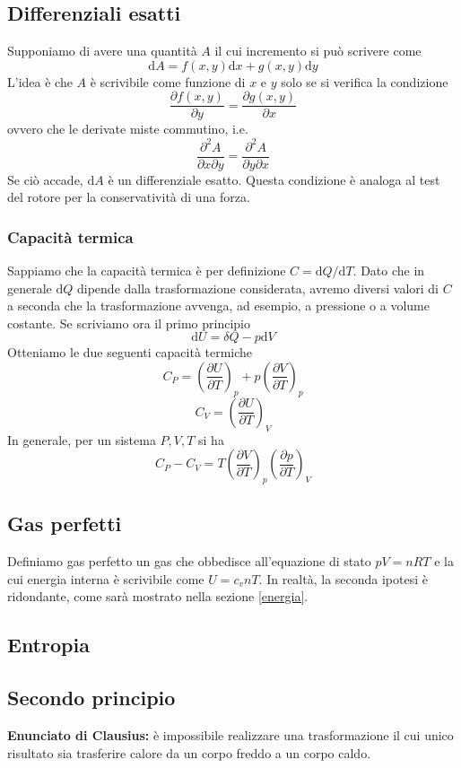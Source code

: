 \documentclass[a4paper,11pt]{article}
\begin{document}
\subsection{Differenziali esatti}
Supponiamo di avere una quantità $A$ il cui incremento si può scrivere come
\[\mathrm{d}A=f(x,y)\mathrm{d}x+g(x,y)\mathrm{d}y\]
L'idea è che $A$ è scrivibile come funzione di $x$ e $y$ solo se si verifica la condizione
\[\frac{\partial f(x,y)}{\partial y}=\frac{\partial g(x,y)}{\partial x}\]
ovvero che le derivate miste commutino, i.e.
\[\frac{\partial^2A}{\partial x\partial y}=\frac{\partial^2A}{\partial y\partial x}\]
Se ciò accade, $\mathrm{d}A$ è un differenziale esatto. Questa condizione è analoga al test del rotore per la conservatività di una forza.

\subsubsection{Capacità termica}
Sappiamo che la capacità termica è per definizione $C=\mathrm{d}Q/\mathrm{d}T$. Dato che in generale $\mathrm{d}Q$ dipende dalla trasformazione considerata, avremo diversi valori di $C$ a seconda che la trasformazione avvenga, ad esempio, a pressione o a volume costante. Se scriviamo ora il primo principio
\[\mathrm{d}U=\delta Q-p\mathrm{d}V\]
Otteniamo le due seguenti capacità termiche
\[C_P=\left(\frac{\partial U}{\partial T}\right)_p+p\left(\frac{\partial V}{\partial T}\right)_p\]
\[C_V=\left(\frac{\partial U}{\partial T}\right)_V\]
In generale, per un sistema $P,V,T$ si ha
\[C_P-C_V=T\left(\frac{\partial V}{\partial T}\right)_{p}\left(\frac{\partial p}{\partial T}\right)_{V}\]

\subsection{Gas perfetti}
Definiamo gas perfetto un gas che obbedisce all'equazione di stato $pV=nRT$ e la cui energia interna è scrivibile come $U=c_vnT$. In realtà, la seconda ipotesi è ridondante, come sarà mostrato nella sezione \ref{energia}.

\subsection{Entropia}
\subsection{Secondo principio}
\textbf{Enunciato di Clausius:} è impossibile realizzare una trasformazione il cui unico risultato sia trasferire calore da un corpo freddo a un corpo caldo.
\end{document}
